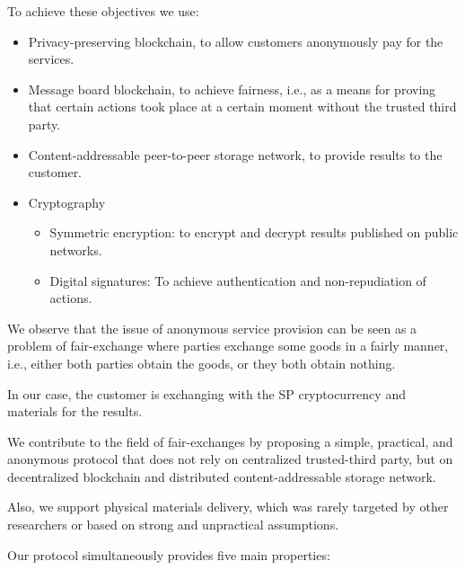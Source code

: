 \documentclass{ieeeaccess}
\begin{document}
To achieve these objectives we use:
\begin{itemize}
    \item Privacy-preserving blockchain, to allow customers anonymously pay for the services.
    \item Message board blockchain, to achieve fairness, i.e., as a means for proving that certain actions took place at a certain moment without the trusted third party.
    \item Content-addressable peer-to-peer storage network, to provide results to the customer. 
    \item Cryptography
    \begin{itemize}
        \item Symmetric encryption: to encrypt and decrypt results published on public networks.
        \item Digital signatures: To achieve authentication and non-repudiation of actions. 
    \end{itemize}
    
\end{itemize}

We observe that the issue of anonymous service provision can be seen as a problem of fair-exchange where parties exchange some goods in a fairly manner, i.e., either both parties obtain the goods, or they both obtain nothing.

In our case, the customer is exchanging with the SP cryptocurrency and materials for the results.

We contribute to the field of fair-exchanges by proposing a simple,
 practical, and anonymous protocol that does not rely on centralized trusted-third party, but on decentralized blockchain and
distributed content-addressable storage network.

Also, we support physical materials delivery, which was rarely targeted by other researchers or based on strong and unpractical assumptions.

Our protocol simultaneously provides five main properties:
\end{document}
